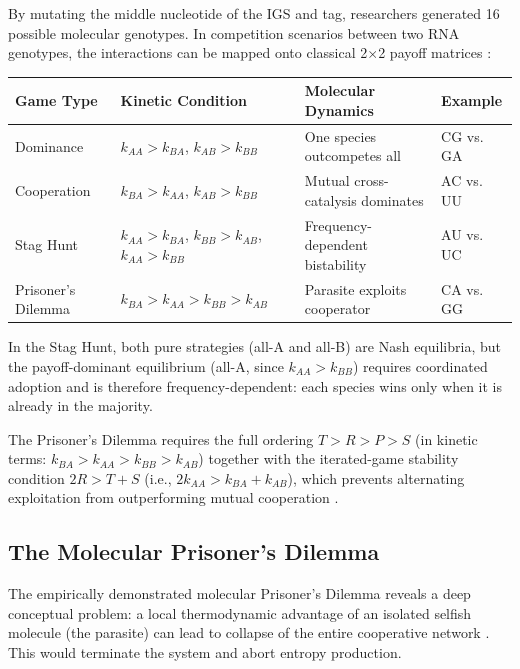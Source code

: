 \documentclass[12pt,a4paper]{article}
\theoremstyle{remark}
\begin{document}
By mutating the middle nucleotide of the IGS and tag, researchers generated 16 possible molecular genotypes. In competition scenarios between two RNA genotypes, the interactions can be mapped onto classical 2$\times$2 payoff matrices \citep{AzoarcusPMC}:

\begin{center}
\begin{tabular}{llll}
\toprule
\textbf{Game Type} & \textbf{Kinetic Condition} & \textbf{Molecular Dynamics} & \textbf{Example} \\
\midrule
Dominance & $k_{AA} > k_{BA}$, $k_{AB} > k_{BB}$ & One species outcompetes all & CG vs. GA \\
Cooperation & $k_{BA} > k_{AA}$, $k_{AB} > k_{BB}$ & Mutual cross-catalysis dominates & AC vs. UU \\
Stag Hunt & $k_{AA} > k_{BA}$, $k_{BB} > k_{AB}$, $k_{AA} > k_{BB}$ & Frequency-dependent bistability & AU vs. UC \\
Prisoner's Dilemma & $k_{BA} > k_{AA} > k_{BB} > k_{AB}$ & Parasite exploits cooperator & CA vs. GG \\
\bottomrule
\end{tabular}
\end{center}

\noindent
In the Stag Hunt, both pure strategies (all-A and all-B) are Nash equilibria, but the payoff-dominant equilibrium (all-A, since $k_{AA} > k_{BB}$) requires coordinated adoption and is therefore frequency-dependent: each species wins only when it is already in the majority.

The Prisoner's Dilemma requires the full ordering $T > R > P > S$ (in kinetic terms: $k_{BA} > k_{AA} > k_{BB} > k_{AB}$) together with the iterated-game stability condition $2R > T + S$ (i.e., $2k_{AA} > k_{BA} + k_{AB}$), which prevents alternating exploitation from outperforming mutual cooperation \citep{HofbauerSigmund1998}.

\subsection{The Molecular Prisoner's Dilemma}

The empirically demonstrated molecular Prisoner's Dilemma reveals a deep conceptual problem: a local thermodynamic advantage of an isolated selfish molecule (the parasite) can lead to collapse of the entire cooperative network \citep{AzoarcusPMC}. This would terminate the system and abort entropy production.
\end{document}
